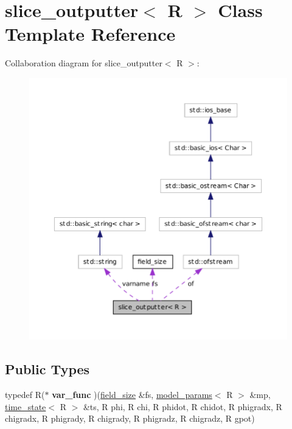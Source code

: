 \hypertarget{classslice__outputter}{
\section{slice\_\-outputter$<$ R $>$ Class Template Reference}
\label{classslice__outputter}
}


Collaboration diagram for slice\_\-outputter$<$ R $>$:
\nopagebreak
\begin{figure}[H]
\begin{center}
\leavevmode
\includegraphics[width=400pt]{classslice__outputter__coll__graph}
\end{center}
\end{figure}
\subsection*{Public Types}
\begin{DoxyCompactItemize}
\item 
\hypertarget{classslice__outputter_a0917a3b6bc70da35b0b2344342d9ab87}{
typedef R($\ast$ {\bfseries var\_\-func} )(\hyperlink{structfield__size}{field\_\-size} \&fs, \hyperlink{structmodel__params}{model\_\-params}$<$ R $>$ \&mp, \hyperlink{structtime__state}{time\_\-state}$<$ R $>$ \&ts, R phi, R chi, R phidot, R chidot, R phigradx, R chigradx, R phigrady, R chigrady, R phigradz, R chigradz, R gpot)}
\label{classslice__outputter_a0917a3b6bc70da35b0b2344342d9ab87}

\end{DoxyCompactItemize}
